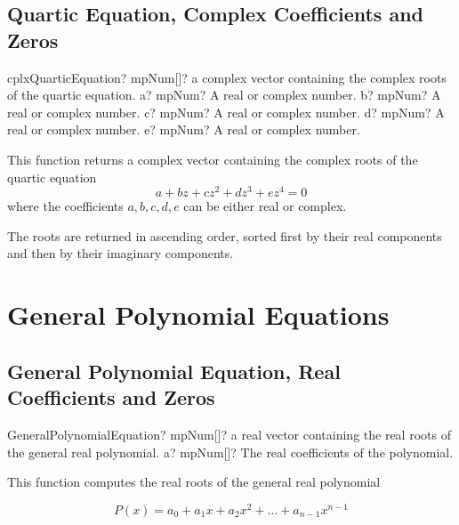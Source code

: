 \subsection{Quartic Equation, Complex Coefficients and Zeros}

\begin{mpFunctionsExtract}
	\mpFunctionFive
	{cplxQuarticEquation? mpNum[]? a complex vector containing the complex roots of the quartic equation.}
	{a? mpNum? A real or complex number.}
	{b? mpNum? A real or complex number.}
	{c? mpNum? A real or complex number.}
	{d? mpNum? A real or complex number.}
	{e? mpNum? A real or complex number.}
\end{mpFunctionsExtract}


\vspace{0.3cm}
This function returns  a complex vector containing the complex roots of the quartic equation
\begin{equation}
a  + b z + c z^2 + d z^3  + e z^4  = 0
\end{equation}
where the coefficients $a, b, c, d, e$ can be either real or complex. 

The roots are returned in ascending order, sorted first by their real components and then by their imaginary components.




\section{General Polynomial Equations}
\label{GeneralPolynomialEquationsPolynomials}

\subsection{General Polynomial Equation, Real Coefficients and Zeros}

\begin{mpFunctionsExtract}
	\mpFunctionOne
	{GeneralPolynomialEquation? mpNum[]? a real vector containing the real roots of the general real polynomial.}
	{a? mpNum[]? The real coefficients of the polynomial.}
\end{mpFunctionsExtract}


\vspace{0.3cm}
This function computes the real roots of the general real polynomial

\begin{equation}
P(x) = a_0 + a_1x + a_2x^2 + \ldots +  a_{n-1} x^{n-1}
\end{equation}

